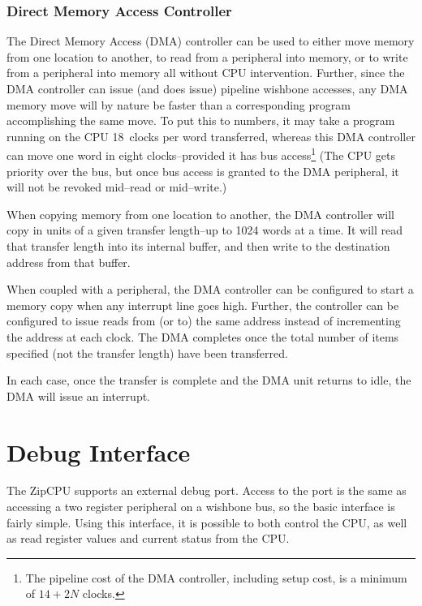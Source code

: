 \documentclass{gqtekspec}
\begin{document}
\subsubsection{Direct Memory Access Controller}

The Direct Memory Access (DMA) controller can be used to either move memory
from one location to another, to read from a peripheral into memory, or to
write from a peripheral into memory all without CPU intervention.  Further,
since the DMA controller can issue (and does issue) pipeline wishbone accesses,
any DMA memory move will by nature be faster than a corresponding program
accomplishing the same move.  To put this to numbers, it may take a program
running on the CPU 18~clocks per word transferred, whereas this DMA controller
can move one word in eight clocks--provided it has bus
access\footnote{The pipeline cost of the DMA controller, including setup cost,
is a minimum of $14+2N$ clocks.} (The CPU gets priority over the bus, but once
bus access is granted to the DMA peripheral, it will not be revoked mid--read
or mid--write.)

When copying memory from one location to another, the DMA controller will
copy in units of a given transfer length--up to 1024 words at a time.  It will
read that transfer length into its internal buffer, and then write to the
destination address from that buffer.

When coupled with a peripheral, the DMA controller can be configured to start
a memory copy when any interrupt line goes high.  Further, the controller can
be configured to issue reads from (or to) the same address instead of
incrementing the address at each clock.  The DMA completes once the total
number of items specified (not the transfer length) have been transferred.

In each case, once the transfer is complete and the DMA unit returns to
idle, the DMA will issue an interrupt.


\section{Debug Interface}\label{sec:debug}

The ZipCPU supports an external debug port.  Access to the port is the
same as accessing a two register peripheral on a wishbone bus, so the basic
interface is fairly simple.  Using this interface, it is possible to both
control the CPU, as well as read register values and current status from the
CPU.
\end{document}
